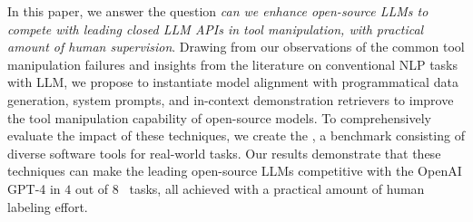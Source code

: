 

In this paper, we answer the question \emph{can we enhance open-source LLMs to compete with leading closed LLM APIs in tool manipulation, with practical amount of human supervision}. 
Drawing from our observations of the common tool manipulation failures and insights from the literature on conventional NLP tasks with LLM, we propose to instantiate model alignment with programmatical data generation, system prompts, and in-context demonstration retrievers to improve the tool manipulation capability of open-source models.
To comprehensively evaluate the impact of these techniques, we create the \textit{\snact}, a benchmark consisting of diverse software tools for real-world tasks. 
Our results demonstrate that these techniques can make the leading open-source LLMs competitive with the OpenAI GPT-4 in $4$ out of $8$ \snact\  tasks, all achieved with a practical amount of human labeling effort.

